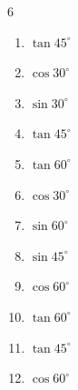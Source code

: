 \begin{multicols}{6}
\begin{enumerate}

  \item $\displaystyle \tan{45^\circ}$

        \phantom{$\displaystyle =1$}

  \item $\displaystyle \cos{30^\circ}$


  \item $\displaystyle \sin{30^\circ}$


  \item $\displaystyle \tan{45^\circ}$

        \phantom{$\displaystyle =1$}

  \item $\displaystyle \tan{60^\circ}$


\columnbreak %

  \item $\displaystyle \cos{30^\circ}$


  \item $\displaystyle \sin{60^\circ}$


  \item $\displaystyle \sin{45^\circ}$


  \item $\displaystyle \cos{60^\circ}$


  \item $\displaystyle \tan{60^\circ}$


  \item $\displaystyle \tan{45^\circ}$

        \phantom{$\displaystyle =1$}

  \item $\displaystyle \cos{60^\circ}$



\end{enumerate}
\end{multicols}
